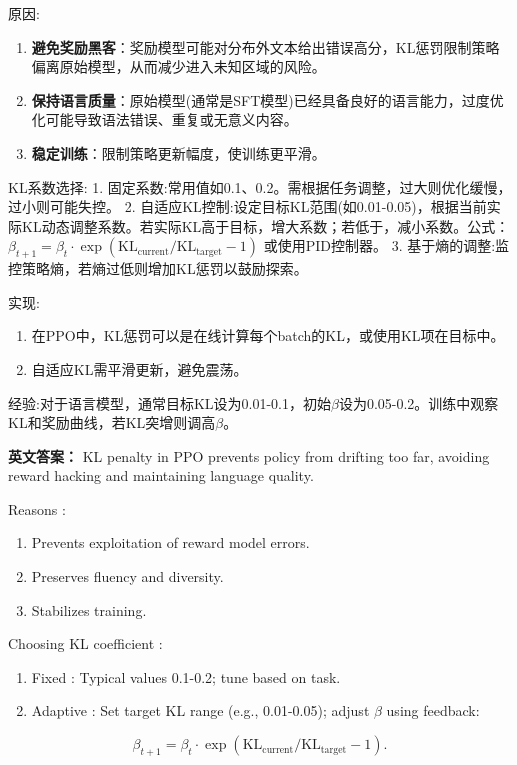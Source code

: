 \documentclass[10pt,a4paper]{ctexart}
\begin{document}
 原因:
\begin{enumerate}
    \item \textbf{避免奖励黑客}：奖励模型可能对分布外文本给出错误高分，KL惩罚限制策略偏离原始模型，从而减少进入未知区域的风险。
    \item \textbf{保持语言质量}：原始模型(通常是SFT模型)已经具备良好的语言能力，过度优化可能导致语法错误、重复或无意义内容。
    \item \textbf{稳定训练}：限制策略更新幅度，使训练更平滑。
\end{enumerate}

 KL系数选择:
1.  固定系数:常用值如0.1、0.2。需根据任务调整，过大则优化缓慢，过小则可能失控。
2.  自适应KL控制:设定目标KL范围(如0.01-0.05)，根据当前实际KL动态调整系数。若实际KL高于目标，增大系数；若低于，减小系数。公式：\(\beta_{t+1} = \beta_t \cdot \exp(\text{KL}_{\text{current}} / \text{KL}_{\text{target}} - 1)\) 或使用PID控制器。
3.  基于熵的调整:监控策略熵，若熵过低则增加KL惩罚以鼓励探索。

 实现:
\begin{enumerate}
    \item 在PPO中，KL惩罚可以是在线计算每个batch的KL，或使用KL项在目标中。
    \item 自适应KL需平滑更新，避免震荡。
\end{enumerate}

 经验:对于语言模型，通常目标KL设为0.01-0.1，初始\(\beta\)设为0.05-0.2。训练中观察KL和奖励曲线，若KL突增则调高\(\beta\)。

\textbf{英文答案：}  
KL penalty in PPO prevents policy from drifting too far, avoiding reward hacking and maintaining language quality.

 Reasons :
\begin{enumerate}
    \item Prevents exploitation of reward model errors.
    \item Preserves fluency and diversity.
    \item Stabilizes training.
\end{enumerate}

 Choosing KL coefficient :
\begin{enumerate}
    \item Fixed : Typical values 0.1-0.2; tune based on task.
    \item Adaptive : Set target KL range (e.g., 0.01-0.05); adjust \(\beta\) using feedback:
\end{enumerate}
  \[
  \beta_{t+1} = \beta_t \cdot \exp(\text{KL}_{\text{current}} / \text{KL}_{\text{target}} - 1).
  \]
\end{document}
